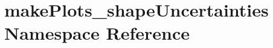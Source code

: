 \hypertarget{namespacemakePlots__shapeUncertainties}{
\section{makePlots\_\-shapeUncertainties Namespace Reference}
\label{namespacemakePlots__shapeUncertainties}
}
